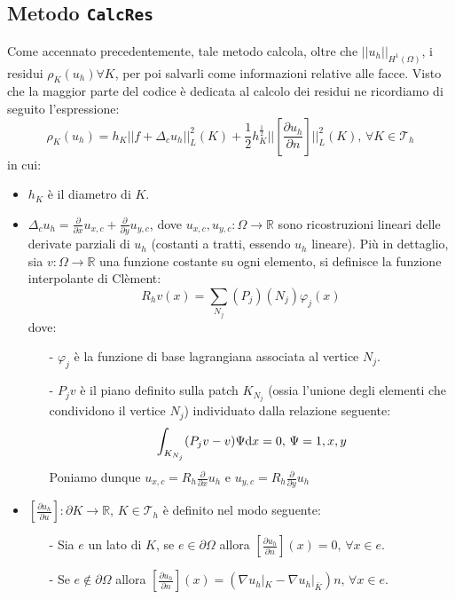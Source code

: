 \documentclass[a4paper,10pt,twoside]{amsart}
\theoremstyle{remark}
\theoremstyle{definition}
\renewcommand{\phi}{\varphi}
\renewcommand{\tt}{\texttt}
\begin{document}
\subsection{Metodo \tt{CalcRes}}
Come accennato precedentemente, tale metodo calcola, oltre che $||u_h||_{H^1 (\Omega)}$, i residui $\rho_K(u_h) \forall K$, per poi salvarli come informazioni relative alle facce. Visto che la maggior parte del codice è dedicata al calcolo dei residui ne ricordiamo di seguito l'espressione:
\[
\rho_K(u_h) = h_K ||f+\Delta_c u_h||_L^2(K) + \frac{1}{2} h_K^{\frac{1}{2}} ||[\frac{\partial u_h}{\partial n}]||_L^2(K), \, \forall K \in \mathcal{T}_h \nonumber
\]
in cui:
\begin{itemize}
\item $h_K$ è il diametro di $K$.
\item $\Delta_c u_h = \frac{\partial}{\partial x} u_{x,c} + \frac{\partial}{\partial y} u_{y,c}$, dove $u_{x,c},u_{y,c}:\Omega\rightarrow\mathbb{R}$ sono ricostruzioni lineari delle derivate parziali di $u_h$ (costanti a tratti, essendo $u_h$ lineare). Più in dettaglio, sia $v:\Omega\rightarrow\mathbb{R}$ una funzione costante su ogni elemento, si definisce la funzione interpolante di Clèment:
\[
R_h v(x) = \sum_{N_j}(P_j)(N_j)\phi_j(x) \nonumber 
\]
dove:
\begin{itemize}
\item[-] $\phi_j$ è la funzione di base lagrangiana associata al vertice $N_j$.
\item[-] $P_j v$ è il piano definito sulla patch $K_{N_j}$ (ossia l'unione degli elementi che condividono il vertice $N_j$) individuato dalla relazione seguente:
\[
\int_{K_{N_j}} (P_j v -v)\Psi {\rm d}x = 0, \, \Psi = 1, x, y \nonumber
\]
Poniamo dunque $u_{x,c} = R_h \frac{\partial}{\partial x} u_h$ e $u_{y,c} = R_h \frac{\partial}{\partial y} u_h$
\end{itemize}
\item $[\frac{\partial u_h}{\partial u}]: \partial K \rightarrow \mathbb{R}, \, K \in \mathcal{T}_h$ è definito nel modo seguente:
\begin{itemize}
\item[-] Sia $e$ un lato di $K$, se $e \in \partial \Omega$ allora $[\frac{\partial u_h}{\partial n}](x) = 0, \, \forall x \in e$.
\item[-] Se $e \notin \partial \Omega$ allora $[\frac{\partial u_h}{\partial n}](x) = (\nabla u_h |_K - \nabla u_h |_{\bar{K}})n, \, \forall x \in e$. 
\end{itemize}
\end{itemize}
{}
 
\end{document}
